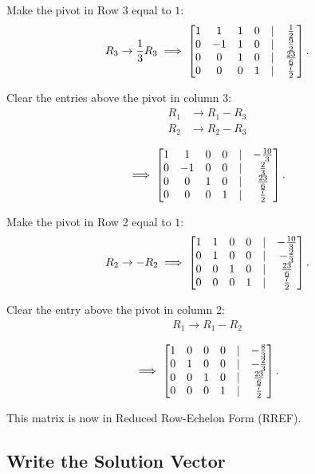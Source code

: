 Make the pivot in Row 3 equal to $1$:
\begin{align*}
R_3 \rightarrow \frac{1}{3}R_3
\implies
\begin{bmatrix} 
1 & 1 & 1 & 0 & \vert & \frac{1}{2}\\
0 & -1 & 1 & 0 & \vert & \frac{9}{2}\\
0 & 0 & 1 & 0 & \vert & \frac{23}{6}\\
0 & 0 & 0 & 1 & \vert & \frac{7}{2}
 \end{bmatrix}.
\end{align*}

Clear the entries above the pivot in column 3:
\begin{align*}
R_1 &\rightarrow R_1 - R_3\\
R_2 &\rightarrow R_2 - R_3
\end{align*}

\begin{align*}
\implies
\begin{bmatrix} 
1 & 1 & 0 & 0 & \vert & -\frac{10}{3}\\
0 & -1 & 0 & 0 & \vert & \frac{2}{3}\\
0 & 0 & 1 & 0 & \vert & \frac{23}{6}\\
0 & 0 & 0 & 1 & \vert & \frac{7}{2}
 \end{bmatrix}.
\end{align*}

Make the pivot in Row 2 equal to $1$:
\begin{align*}
R_2 \rightarrow -R_2
\implies
\begin{bmatrix} 
1 & 1 & 0 & 0 & \vert & -\frac{10}{3}\\
0 & 1 & 0 & 0 & \vert & -\frac{2}{3}\\
0 & 0 & 1 & 0 & \vert & \frac{23}{6}\\
0 & 0 & 0 & 1 & \vert & \frac{7}{2}
 \end{bmatrix}.
\end{align*}

Clear the entry above the pivot in column 2:
\begin{align*}
R_1 \rightarrow R_1 - R_2
\end{align*}

\begin{align*}
\implies
\begin{bmatrix} 
1 & 0 & 0 & 0 & \vert & -\frac{8}{3}\\
0 & 1 & 0 & 0 & \vert & -\frac{2}{3}\\
0 & 0 & 1 & 0 & \vert & \frac{23}{6}\\
0 & 0 & 0 & 1 & \vert & \frac{7}{2}
 \end{bmatrix}.
\end{align*}

This matrix is now in Reduced Row-Echelon Form (RREF).

\subsection{Write the Solution Vector}


